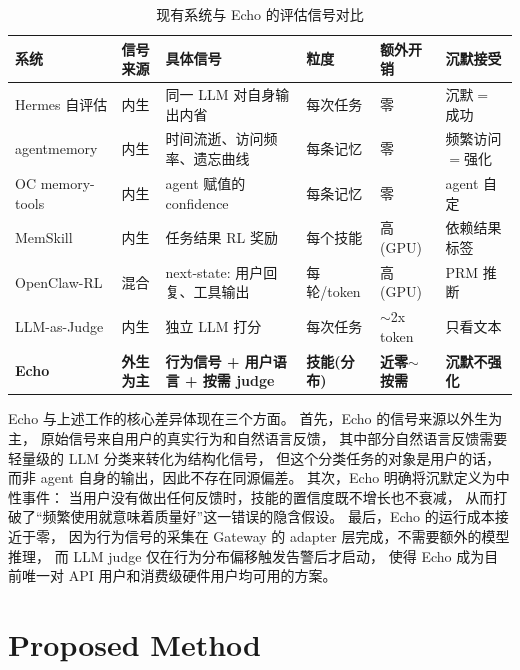 \documentclass[12pt,a4paper]{article}
\begin{document}
	\begin{table}[H]
		\centering
		\small
		\renewcommand{\arraystretch}{1.3}
		\caption{现有系统与 Echo 的评估信号对比}
		\label{tab:comparison}
		\begin{tabular}{@{}p{2cm}p{1.5cm}p{3.8cm}p{1.5cm}p{1.5cm}p{2.5cm}@{}}
			\toprule
			\textbf{系统} & \textbf{信号来源} & \textbf{具体信号} & \textbf{粒度} & \textbf{额外开销} & \textbf{沉默接受} \\
			\midrule
			Hermes 自评估 & 内生 & 同一 LLM 对自身输出内省 & 每次任务 & 零 & 沉默$=$成功 \\
			agentmemory & 内生 & 时间流逝、访问频率、遗忘曲线 & 每条记忆 & 零 & 频繁访问$=$强化 \\
			OC memory-tools & 内生 & agent 赋值的 confidence & 每条记忆 & 零 & agent 自定 \\
			MemSkill & 内生 & 任务结果 RL 奖励 & 每个技能 & 高(GPU) & 依赖结果标签 \\
			OpenClaw-RL & 混合 & next-state: 用户回复、工具输出 & 每轮/token & 高(GPU) & PRM 推断 \\
			LLM-as-Judge & 内生 & 独立 LLM 打分 & 每次任务 & ${\sim}$2x token & 只看文本 \\
			\midrule
			\textbf{Echo} & \textbf{外生为主} & \textbf{行为信号 + 用户语言 + 按需 judge} & \textbf{技能(分布)} & \textbf{近零$\sim$按需} & \textbf{沉默不强化} \\
			\bottomrule
		\end{tabular}
	\end{table}
	
	Echo 与上述工作的核心差异体现在三个方面。
	首先，Echo 的信号来源以外生为主，
	原始信号来自用户的真实行为和自然语言反馈，
	其中部分自然语言反馈需要轻量级的 LLM 分类来转化为结构化信号，
	但这个分类任务的对象是用户的话，而非 agent 自身的输出，因此不存在同源偏差。
	其次，Echo 明确将沉默定义为中性事件：
	当用户没有做出任何反馈时，技能的置信度既不增长也不衰减，
	从而打破了``频繁使用就意味着质量好''这一错误的隐含假设。
	最后，Echo 的运行成本接近于零，
	因为行为信号的采集在 Gateway 的 adapter 层完成，不需要额外的模型推理，
	而 LLM judge 仅在行为分布偏移触发告警后才启动，
	使得 Echo 成为目前唯一对 API 用户和消费级硬件用户均可用的方案。
	
	
	\section{Proposed Method}
	
\end{document}
